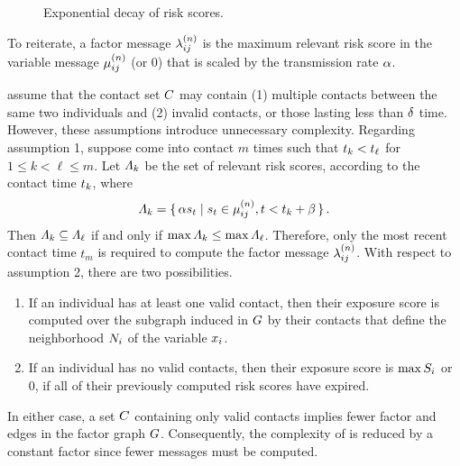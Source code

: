 \begin{figure}[htbp]
\centering
{}
\caption[Exponential decay of risk scores]{Exponential decay of risk scores.}
\label{fig:decay}
\end{figure}

To reiterate, a factor message $\lambda_{ij}^{(n)}$ is the maximum relevant risk score in the variable message $\mu_{ij}^{(n)}$ (or 0) that is scaled by the transmission rate $\alpha$.

\citet{Ayday2021} assume that the contact set $C$ may contain (1) multiple contacts between the same two individuals and (2) invalid contacts, or those lasting less than $\delta$ time. However, these assumptions introduce unnecessary complexity. Regarding assumption 1, suppose  come into contact $m$ times such that $t_k < t_\ell$ for $1 \leq k < \ell \leq m$. Let $\varLambda_k$ be the set of relevant risk scores, according to the contact time $t_k$, where
\begin{equation*}
  \varLambda_k = \set{ \alpha s_t | s_t\in \mu_{ij}^{(n)}, t< t_k + \beta}.
\end{equation*}
Then $\varLambda_k \subseteq \varLambda_\ell$ if and only if $\max \varLambda_k \leq \max \varLambda_\ell$. Therefore, only the most recent contact time $t_m$ is required to compute the factor message $\lambda_{ij}^{(n)}$. With respect to assumption 2, there are two possibilities.
\begin{enumerate}
  \item If an individual has at least one valid contact, then their exposure score is computed over the subgraph induced in $G$ by their contacts that define the neighborhood $N_i$ of the variable \vertexName $\vVariable_i$.
  \item If an individual has no valid contacts, then their exposure score is $\max S_i$ or $0$, if all of their previously computed risk scores have expired.
\end{enumerate}
In either case, a set $C$ containing only valid contacts implies fewer factor \verticesName and edges in the factor graph $G$. Consequently, the complexity of \cRiskPropagation is reduced by a constant factor since fewer messages must be computed.

